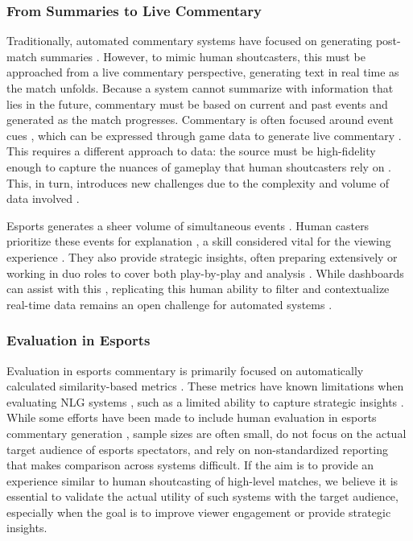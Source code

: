 \subsubsection{From Summaries to Live Commentary}
Traditionally, automated commentary systems have focused on generating post-match summaries \cite{vanderlee2017, wiseman2017, puduppully2019}. However, to mimic human shoutcasters, this must be approached from a live commentary perspective, generating text in real time as the match unfolds. Because a system cannot summarize with information that lies in the future, commentary must be based on current and past events and generated as the match progresses. Commentary is often focused around event cues \cite{dodge2018}, which can be expressed through game data to generate live commentary \cite{taniguchi2019, wang2021, zhang2024}. This requires a different approach to data: the source must be high-fidelity enough to capture the nuances of gameplay that human shoutcasters rely on \cite{dodge2018}. This, in turn, introduces new challenges due to the complexity and volume of data involved \cite{wang2021, kim2025}.

Esports generates a sheer volume of simultaneous events \cite{lux2019}. Human casters prioritize these events for explanation \cite{dodge2018}, a skill considered vital for the viewing experience \cite{kempecook2019}. They also provide strategic insights, often preparing extensively \cite{li2020} or working in duo roles to cover both play-by-play and analysis \cite{kempecook2019}. While dashboards can assist with this \cite{charleer2018, margetis2023}, replicating this human ability to filter and contextualize real-time data remains an open challenge for automated systems \cite{dodge2018, kim2025}.

\subsubsection{Evaluation in Esports}
Evaluation in esports commentary is primarily focused on automatically calculated similarity-based metrics \cite{wang2021, zhang2022, zhang2024}. These metrics have known limitations when evaluating NLG systems \cite{vanderlee2019}, such as a limited ability to capture strategic insights \cite{wang2021}. While some efforts have been made to include human evaluation in esports commentary generation \cite{wang2024}, sample sizes are often small, do not focus on the actual target audience of esports spectators, and rely on non-standardized reporting that makes comparison across systems difficult. If the aim is to provide an experience similar to human shoutcasting of high-level matches, we believe it is essential to validate the actual utility of such systems with the target audience, especially when the goal is to improve viewer engagement or provide strategic insights.

